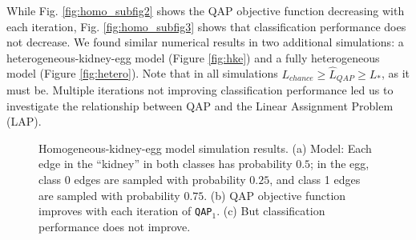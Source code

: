 \documentclass{article} %
\providecommand{\mh}[1]{\hat{#1}}
\newcommand{\qapa}{\texttt{QAP}$_1$ }
\begin{document}

While Fig. \ref{fig:homo_subfig2} shows the QAP objective function decreasing with each iteration, Fig. \ref{fig:homo_subfig3} shows that classification performance does not decrease.  We found similar numerical results in two additional simulations: a heterogeneous-kidney-egg model (Figure \ref{fig:hke}) and a fully heterogeneous model (Figure \ref{fig:hetero}). Note that in all simulations $L_{chance} \geq \mh{L}_{QAP} \geq L_*$, as it must be.  Multiple iterations not improving classification performance led us to investigate the relationship between QAP and the Linear Assignment Problem (LAP).


\begin{figure}[ht]
\centering
{}
\label{fig:homo}
\caption{Homogeneous-kidney-egg model simulation results. (a) Model: Each edge in the ``kidney'' in both classes has probability $0.5$; in the egg, class 0 edges are sampled with probability $0.25$, and class 1 edges are sampled with probability $0.75$. (b) QAP objective function improves with each iteration of \texttt{QAP}$_1$. (c) But classification performance does not improve.}
\end{figure}
\end{document}
